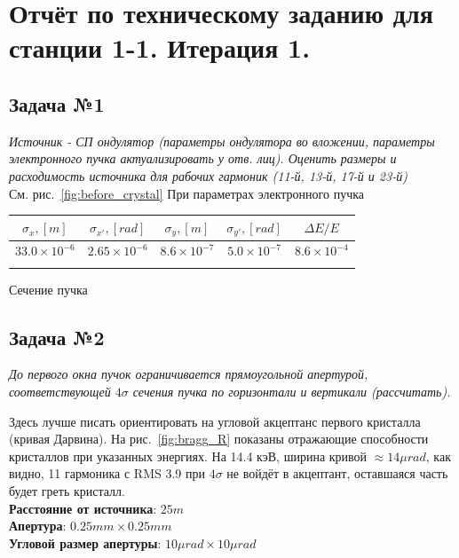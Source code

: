 \documentclass[14pt,a4paper]{extarticle}
\numberwithin{equation}{section}
\begin{document}
\section{Отчёт по техническому заданию для станции 1-1. Итерация 1.}
\subsection{Задача №1}
\textit{Источник - СП ондулятор (параметры ондулятора во вложении, параметры электронного пучка актуализировать у отв. лиц). Оценить размеры и расходимость источника для рабочих гармоник (11-й, 13-й, 17-й и 23-й)}\\
См. рис.~\ref{fig:before_crystal}
При параметрах электронного пучка\\
\begin{table}[h!]
	\centering
	\begin{tabular}{ccccc}
		\hline
		\toprule
		\rule{0pt}{3ex}   $\sigma_x, [m]$ & $\sigma_{x'}, [rad]$ & $\sigma_y, [m]$     & $\sigma_{y'}, [rad]$ & $\Delta E / E$      \\ \hline
		\rule{0pt}{3ex}   $33.0 \times 10^{-6}$  & $2.65 \times 10^{-6}$  &  $8.6 \times 10^{-7}$ & $5.0 \times 10^{-7}$   & $8.6 \times 10^{-4}$ \\
		\hline	
		\toprule
		\rule{0pt}{4ex}
	\end{tabular}
\end{table}


\begin{table}[h!]
	\renewcommand*\dtlrealalign{S}
	\caption{Сечение пучка}
	\centering
\end{table}

\subsection{Задача №2}
\textit{До первого окна пучок ограничивается прямоугольной апертурой, соответствующей $4\sigma$ сечения пучка по горизонтали и вертикали (рассчитать).}

Здесь лучше писать ориентировать на угловой акцептанс первого кристалла (кривая Дарвина). На рис.~\ref{fig:bragg_R} показаны отражающие способности кристаллов при указанных энергиях. На 14.4 кэВ, ширина кривой $\approx 14 \mu rad$, как видно, 11 гармоника с RMS 3.9 при $4\sigma$ не войдёт в акцептант, оставшаяся часть будет греть кристалл.\\
\textbf{Расстояние от источника}: $25m$\\
\textbf{Апертура}: $0.25mm \times 0.25mm$\\
\textbf{Угловой размер апертуры}: $10\mu rad \times  10 \mu rad$ 
\end{document}
